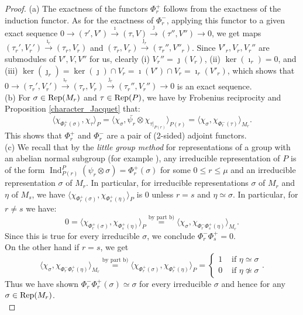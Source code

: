 \documentclass[reqno]{amsart}
\theoremstyle{definition}
\theoremstyle{remark}
\numberwithin{equation}{section}
\DeclareMathOperator{\Ind}{Ind}
\begin{document}
\begin{proof}
(a) The exactness of the functors $\Phi_r^+$ follows from the exactness of the induction functor. As for the exactness of $\Phi_r^-$, applying this  functor to a given exact sequence $0 \to (\tau',V') \xrightarrow{\imath} (\tau, V) \xrightarrow{\jmath} (\tau'', V'') \to 0$, we get maps $(\tau_r',V_r') \xrightarrow{\imath_r} (\tau_r, V_r)$ and $ (\tau_r, V_r) \xrightarrow{\jmath_r} (\tau_r'', V''_r)$. Since $V'_r, V_r, V_r''$ are submodules of $V', V, V''$ for us,  clearly (i)  $V_r''=\jmath(V_r)$, (ii) $\ker(\imath_r)=0$, and (iii) $\ker(\jmath_r)=\ker(\jmath) \cap V_r = \imath(V') \cap V_r = \imath_r(V'_r)$, which shows that $0 \to (\tau_r',V_r') \xrightarrow{\imath_r} (\tau_r, V_r) \xrightarrow{\jmath_r} (\tau_r'', V_r'') \to 0$ is an exact sequence.\\

(b) For $\sigma \in {\rm Rep}(M_r)$ and $\tau \in {\rm Rep}(P)$, we have by Frobenius reciprocity and Proposition \ref{character_Jacquet} that: 
\[ \langle \chi_{\Phi_r^+(\sigma)}, \chi_\tau \rangle_P = \langle \chi_\sigma, \bar{\psi_r} \otimes \chi_{\tau|_{P(r)}} \rangle_{P(r)}=\langle \chi_\sigma, \chi_{\Phi_r^-(\tau)} \rangle_{M_r}.\]
This shows that $\Phi_r^+$ and $\Phi_r^-$ are a pair of (2-sided) adjoint functors.\\

(c)  We recall that by the \emph{little group method} for representations of a group with an abelian normal subgroup  (for example \cite[Theorem 5.2]{CecScaTol}),  any irreducible representation of $P$ is of the form $\Ind_{P(r)}^P (\psi_r \otimes \sigma)=\Phi_r^+(\sigma)$  for some $0 \leq r \leq \mu$ and an irreducible representation $\sigma$ of $M_r$. In particular, for irreducible representations $\sigma$ of $M_r$ and $\eta$ of $M_s$, we have $\langle \chi_{\Phi_r^+(\sigma)}, \chi_{\Phi_s^+(\eta)} \rangle_P$ is $0$ unless $r=s$ and $\eta \simeq \sigma$. In particular, for $r \neq s$ we have:
\[ 0= \langle \chi_{\Phi_r^+(\sigma)}, \chi_{\Phi_s^+(\eta)} \rangle_P \overset{\text{by part b)}}{=} \langle \chi_\sigma, \chi_{\Phi_r^- \Phi_s^+(\eta)} \rangle_{M_r}.\]
Since this is true for every irreducible $\sigma$, we conclude $\Phi_r^{-} \Phi_s^+ =0$.\\
On the other hand if $r=s$, we get
\[  \langle \chi_\sigma, \chi_{\Phi_r^- \Phi_r^+(\eta)} \rangle_{M_r} \overset{\text{by part b)}}{=}  \langle \chi_{\Phi_r^+(\sigma)}, \chi_{\Phi_r^+(\eta)} \rangle_P   = \begin{cases}
    1 &\text{ if  $\eta \simeq \sigma$}\\0  &\text{ if  $\eta \not\simeq \sigma$}
\end{cases}.\]
Thus we have shown $\Phi_r^- \Phi_r^+(\sigma) \simeq \sigma$ for every irreducible $\sigma$ and hence for any $\sigma \in {\rm Rep}(M_r)$.\\


\end{proof}
\end{document}
